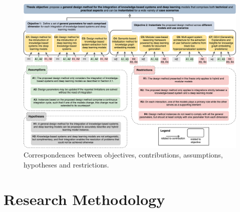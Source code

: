 \begin{figure}
  \centering
  \includegraphics[width=\linewidth]{3_objectives/figures/methodology_general.eps}
  \caption{Correspondences between objectives, contributions, assumptions, hypotheses and restrictions.}
  \label{fig:methodology_general}
\end{figure}

\section{Research Methodology}\label{3_sec:research_methodology}









 



